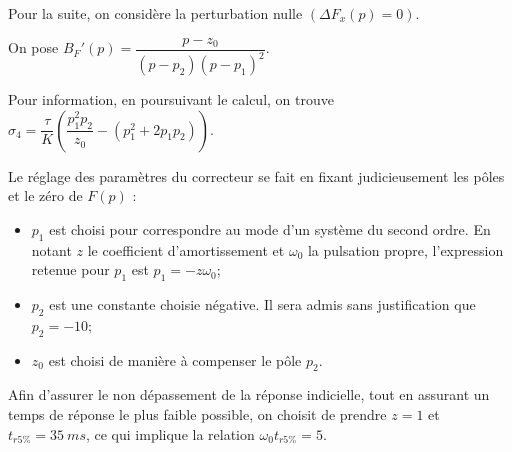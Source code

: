 Pour la suite, on considère la perturbation nulle $\left(\Delta F_x(p)=0\right)$.

\ifprof
\begin{corrige}
\end{corrige}
\else
\fi


\ifprof
\begin{corrige}
\end{corrige}
\else
\fi

On pose $B_F'(p)=\dfrac{p-z_0}{\left(p-p_2 \right)\left( p-p_1\right)^2}$.



\ifprof
\begin{corrige}
\end{corrige}
\else
\fi


\ifprof
\begin{corrige}
\end{corrige}
\else
\fi


Pour information, en poursuivant le calcul, on trouve $\sigma_4 = \dfrac{\tau }{K}\left( \dfrac{p_1^2 p_2}{z_0} -\left(p_1^2 + 2p_1 p_2 \right)\right)$.

Le réglage des paramètres du correcteur se fait en fixant judicieusement les pôles et le zéro de $F(p)$ :
\begin{itemize}
\item $p_1$ est choisi pour correspondre au mode d’un système du second ordre. En notant $z$ le coefficient d’amortissement et $\omega_0$ la pulsation propre, l’expression retenue pour $p_1$ est $p_1=-z\omega_0$; 
\item $p_2$ est une constante choisie négative. Il sera admis sans justification que $p_2=-10$;
\item $z_0$ est choisi de manière à compenser le pôle $p_2$.
\end{itemize}
Afin d’assurer le non dépassement de la réponse indicielle, tout en assurant un temps de réponse le plus faible
possible, on choisit de prendre $z=1$ et $t_{r5\%}=\SI{35}{ms}$,  ce qui implique la relation
$\omega_0 t_{r5\%}=5$.

